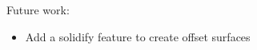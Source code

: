 \documentclass[paperwidth=46in, paperheight = 33.11in]{baposter}%
\begin{document}
\begin{poster}
{\begin{center}
\begin{minipage}[t]{0.90\linewidth}
\begin{itemize}
\end{itemize}


\vspace{1mm}
Future work:
\small
\begin{itemize}
\item \parbox[t]{\dimexpr\textwidth-\leftmargin}{%
         Add a solidify feature to create offset surfaces
}
\end{itemize}

%
%
%
%
%
%


\end{minipage}

\end{center}

}




\end{poster}
\end{document}

